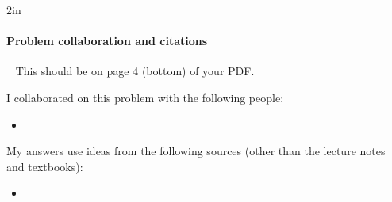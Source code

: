 \vfill
\begin{answerBox}{2in}          %

  \paragraph{Problem  collaboration and citations}~\GradescopeComment
  {This should be on page 4 (bottom) of your PDF.}

  I collaborated on this problem with the following people:
  \begin{blue}
    \begin{itemize}
    \item \REPLACEME                    %
    \end{itemize}
  \end{blue}

  My answers use ideas from the following sources (other than the lecture notes and textbooks): 
  \begin{blue}
    \begin{itemize}
    \item \REPLACEME                    %
    \end{itemize}
  \end{blue}

\end{answerBox}



